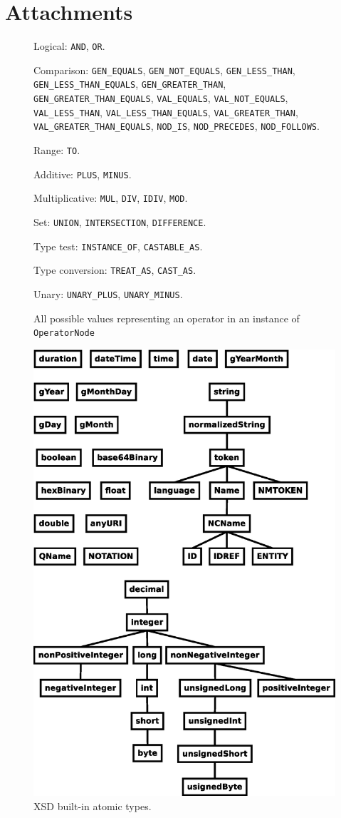 \chapter{Attachments}
\begin{figure}
\caption{All possible values representing an operator in an instance of \texttt{OperatorNode}}
\label{FIG_operators}
Logical: \texttt{AND}, \texttt{OR}.

Comparison: \texttt{GEN\_EQUALS}, \texttt{GEN\_NOT\_EQUALS}, \texttt{GEN\_LESS\_THAN}, \texttt{GEN\_LESS\_THAN\_EQUALS}, \texttt{GEN\_GREATER\_THAN}, \texttt{GEN\_GREATER\_THAN\_EQUALS}, \texttt{VAL\_EQUALS}, \texttt{VAL\_NOT\_EQUALS}, \texttt{VAL\_LESS\_THAN}, \texttt{VAL\_LESS\_THAN\_EQUALS}, \texttt{VAL\_GREATER\_THAN}, \texttt{VAL\_GREATER\_THAN\_EQUALS}, \texttt{NOD\_IS}, \texttt{NOD\_PRECEDES}, \texttt{NOD\_FOLLOWS}.

Range: \texttt{TO}.

Additive: \texttt{PLUS}, \texttt{MINUS}.

Multiplicative: \texttt{MUL}, \texttt{DIV}, \texttt{IDIV}, \texttt{MOD}.

Set: \texttt{UNION}, \texttt{INTERSECTION}, \texttt{DIFFERENCE}.

Type test: \texttt{INSTANCE\_OF}, \texttt{CASTABLE\_AS}.

Type conversion: \texttt{TREAT\_AS}, \texttt{CAST\_AS}.

Unary: \texttt{UNARY\_PLUS}, \texttt{UNARY\_MINUS}.
\end{figure}

\begin{figure}
\caption{XSD built-in atomic types.}
\label{FIG_xsd_built_in_atomic_types}
\includegraphics[scale=0.65]{xsd-types.eps}
\end{figure}
